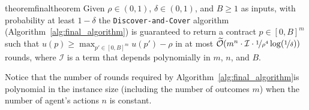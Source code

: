 %
\begin{restatable}{theorem}{finaltheorem}\label{thm:finalthm}
	Given $\rho\in (0,1)$, $\delta \in (0,1)$, and $B \geq 1$ as inputs, with probability at least $1-\delta$ the \textnormal{\texttt{Discover-and-Cover}} algorithm (Algorithm~\ref{alg:final_algorithm}) is guaranteed to return a contract $p \in [0,B]^m$ such that $u(p) \geq \max_{p' \in [0,B]^m} u(p') - \rho$ in at most $\widetilde{\mathcal{O}}( m^n \cdot \mathcal{I} \cdot \nicefrac{1}{\rho^4} \log(\nicefrac{1}{\delta})	)$ rounds, where $\mathcal{I}$ is a term that depends polynomially in $m$, $n$, and $B$.
\end{restatable}
Notice that the number of rounds required by Algorithm~\ref{alg:final_algorithm}is polynomial in the instance size (including the number of outcomes $m$) when the number of agent's actions $n$ is constant.


%


